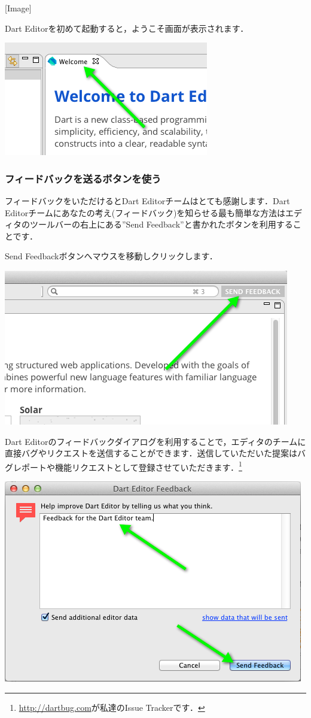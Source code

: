 [Image]

Dart Editorを初めて起動すると，ようこそ画面が表示されます．

\includegraphics{step1/welcome.png}

\subsubsection{フィードバックを送るボタンを使う}

フィードバックをいただけるとDart Editorチームはとても感謝します．Dart Editorチームにあなたの考え(フィードバック)を知らせる最も簡単な方法はエディタのツールバーの右上にある''Send Feedback''と書かれたボタンを利用することです．

Send Feedbackボタンへマウスを移動しクリックします．

\includegraphics{step1/sendfeedback1.png}

Dart Editorのフィードバックダイアログを利用することで，エディタのチームに直接バグやリクエストを送信することができます．送信していただいた提案はバグレポートや機能リクエストとして登録させていただきます．\footnote{\url{http://dartbug.com}が私達のIssue Trackerです．}

\includegraphics{step1/sendfeedback2.png}


